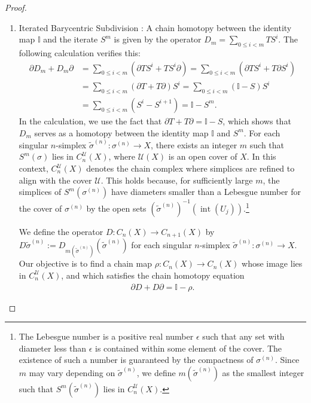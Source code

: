 \begin{proof}
\begin{enumerate}
	\item Iterated Barycentric Subdivision \cite[\S 2.21 (4)]{hatcher2005algebraic}: A chain homotopy between the identity map \( \mathbb{I} \) and the iterate \( S^m \) is given by the operator $D_m = \sum_{0 \leq i < m} T S^i$. The following calculation verifies this:
	\begin{align}
		\partial D_m + D_m \partial & = \sum_{0 \leq i < m} (\partial T S^i + T S^i \partial) = \sum_{0 \leq i < m} (\partial T S^i + T \partial S^i) \\
		                            & = \sum_{0 \leq i < m} (\partial T + T \partial) S^i = \sum_{0 \leq i < m} (\mathbb{I} - S) S^i                  \\
		                            & = \sum_{0 \leq i < m} (S^i - S^{i+1}) = \mathbb{I} - S^m.                                                       
	\end{align}
	In the calculation, we use the fact that \( \partial T + T \partial = \mathbb{I} - S \), which shows that \( D_m \) serves as a homotopy between the identity map \( \mathbb{I} \) and \( S^m \). For each singular \( n \)-simplex \( \tilde{\sigma}^{(n)} : \sigma^{(n)} \to X \), there exists an integer \( m \) such that \( S^m(\sigma) \) lies in \( C_n^{\mathcal{U}}(X) \), where \( \mathcal{U}(X) \) is an open cover of \( X \). In this context, \( C_n^{\mathcal{U}}(X) \) denotes the chain complex where simplices are refined to align with the cover \( \mathcal{U} \). This holds because, for sufficiently large \( m \), the simplices of \( S^m(\sigma^{(n)}) \) have diameters smaller than a Lebesgue number for the cover of \( \sigma^{(n)} \) by the open sets \( (\tilde{\sigma}^{(n)})^{-1}(\operatorname{int}(U_j)) \).\footnote{The Lebesgue number is a positive real number \( \epsilon \) such that any set with diameter less than \( \epsilon \) is contained within some element of the cover. The existence of such a number is guaranteed by the compactness of \( \sigma^{(n)} \). Since \( m \) may vary depending on \( \tilde{\sigma}^{(n)} \), we define \( m(\tilde{\sigma}^{(n)}) \) as the smallest integer such that \( S^m(\tilde{\sigma}^{(n)}) \) lies in \( C_n^{\mathcal{U}}(X) \).}
		
	We define the operator \( D : C_n(X) \to C_{n+1}(X) \) by \( D\tilde{\sigma}^{(n)} := D_{m(\tilde{\sigma}^{(n)})}(\tilde{\sigma}^{(n)}) \) for each singular \( n \)-simplex \( \tilde{\sigma}^{(n)} : \sigma^{(n)} \to X \). Our objective is to find a chain map \( \rho : C_n(X) \to C_n(X) \) whose image lies in \( C_n^{\mathcal{U}}(X) \), and which satisfies the chain homotopy equation
	\begin{align}
		\partial D + D \partial = \mathbb{I} - \rho. 
	\end{align}
		

\end{enumerate}
\end{proof}
